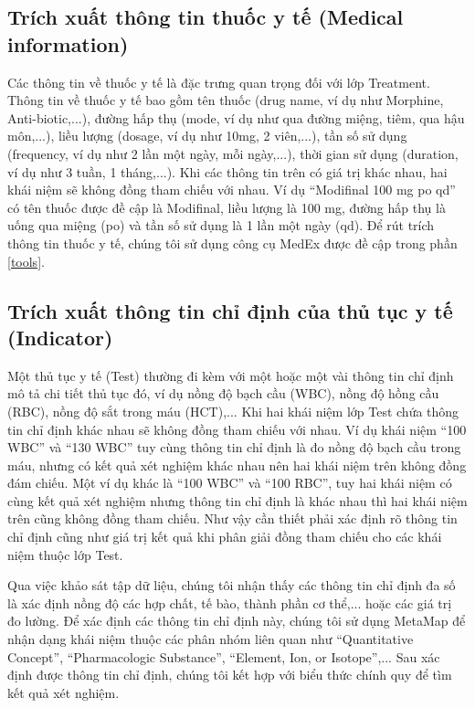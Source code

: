 \subsection*{Trích xuất thông tin thuốc y tế (Medical information)}
Các thông tin về thuốc y tế là đặc trưng quan trọng đối với lớp Treatment. Thông tin về thuốc y tế bao gồm tên thuốc (drug name, ví dụ như Morphine, Anti-biotic,...), đường hấp thụ (mode, ví dụ như qua đường miệng, tiêm, qua hậu môn,...), liều lượng (dosage, ví dụ như 10mg, 2 viên,...), tần số sử dụng (frequency, ví dụ như 2 lần một ngày, mỗi ngày,...), thời gian sử dụng (duration, ví dụ như 3 tuần, 1 tháng,...). Khi các thông tin trên có giá trị khác nhau, hai khái niệm sẽ không đồng tham chiếu với nhau. Ví dụ ``Modifinal 100 mg po qd'' có tên thuốc được đề cập là Modifinal, liều lượng là 100 mg, đường hấp thụ là uống qua miệng (po) và tần số sử dụng là 1 lần một ngày (qd). Để rút trích thông tin thuốc y tế, chúng tôi sử dụng công cụ MedEx được đề cập trong phần \ref{tools}.

\subsection*{Trích xuất thông tin chỉ định của thủ tục y tế (Indicator)}
Một thủ tục y tế (Test) thường đi kèm với một hoặc một vài thông tin chỉ định mô tả chi tiết thủ tục đó, ví dụ nồng độ bạch cầu (WBC), nồng độ hồng cầu (RBC), nồng độ sắt trong máu (HCT),... Khi hai khái niệm lớp Test chứa thông tin chỉ định khác nhau sẽ không đồng tham chiếu với nhau. Ví dụ khái niệm ``100 WBC'' và ``130 WBC'' tuy cùng thông tin chỉ định là đo nồng độ bạch cầu trong máu, nhưng có kết quả xét nghiệm khác nhau nên hai khái niệm trên không đồng đám chiếu. Một ví dụ khác là ``100 WBC'' và ``100 RBC'', tuy hai khái niệm có cùng kết quả xét nghiệm nhưng thông tin chỉ định là khác nhau thì hai khái niệm trên cũng không đồng tham chiếu. Như vậy cần thiết phải xác định rõ thông tin chỉ định cũng như giá trị kết quả khi phân giải đồng tham chiếu cho các khái niệm thuộc lớp Test.

Qua việc khảo sát tập dữ liệu, chúng tôi nhận thấy các thông tin chỉ định đa số là xác định nồng độ các hợp chất, tế bào, thành phần cơ thể,... hoặc các giá trị đo lường. Để xác định các thông tin chỉ định này, chúng tôi sử dụng MetaMap để nhận dạng khái niệm thuộc các phân nhóm liên quan như ``Quantitative Concept'', ``Pharmacologic Substance'', ``Element, Ion, or Isotope'',... Sau xác định được thông tin chỉ định, chúng tôi kết hợp với biểu thức chính quy để tìm kết quả xét nghiệm.

